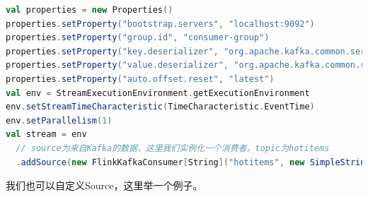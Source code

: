 \documentclass[oneside]{ctexbook}
\begin{document}
\begin{lstlisting}[language=scala, breaklines]
val properties = new Properties()
properties.setProperty("bootstrap.servers", "localhost:9092")
properties.setProperty("group.id", "consumer-group")
properties.setProperty("key.deserializer", "org.apache.kafka.common.serialization.StringDeserializer")
properties.setProperty("value.deserializer", "org.apache.kafka.common.serialization.StringDeserializer")
properties.setProperty("auto.offset.reset", "latest")
val env = StreamExecutionEnvironment.getExecutionEnvironment
env.setStreamTimeCharacteristic(TimeCharacteristic.EventTime)
env.setParallelism(1)
val stream = env
  // source为来自Kafka的数据，这里我们实例化一个消费者，topic为hotitems
  .addSource(new FlinkKafkaConsumer[String]("hotitems", new SimpleStringSchema(), properties))
\end{lstlisting}

我们也可以自定义Source，这里举一个例子。
\end{document}
